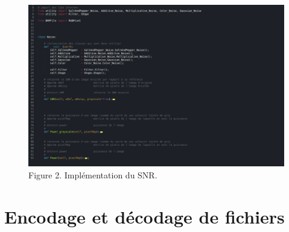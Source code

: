 \documentclass{article}
\begin{document}
		\begin{figure}
			\begin{center}
				\includegraphics[scale=.4]{st3/import_UTILITY.jpg}\\
				Figure 2. Implémentation du SNR.
			\end{center}
		\end{figure}


	\newpage


	
	\part*{Encodage et décodage de fichiers}
		
\end{document}
